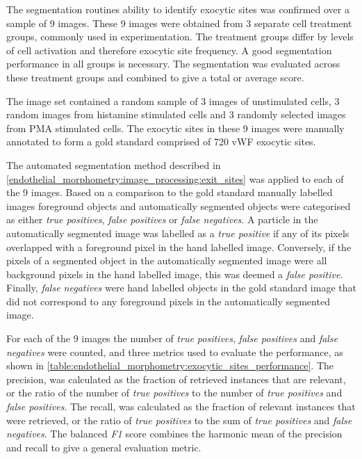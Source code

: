 The segmentation routines ability to identify exocytic sites was confirmed over a sample of 9 images. These 9 images were obtained from 3 separate cell treatment groups, commonly used in experimentation. The treatment groups differ by levels of cell activation and therefore exocytic site frequency. A good segmentation performance in all groups is necessary. The segmentation was evaluated across these treatment groups and combined to give a total or average score.

The image set contained a random sample of 3 images of unstimulated cells, 3 random images from histamine stimulated cells and 3 randomly selected images from PMA stimulated cells. The exocytic sites in these 9 images were manually annotated to form a gold standard comprised of 720 vWF exocytic sites.

The automated segmentation method described in \autoref{endothelial_morphometry:image_processing:exit_sites} was applied to each of the 9 images. Based on a comparison to the gold standard manually labelled images foreground objects and automatically segmented objects were categorised as either \emph{true positives}, \emph{false positives} or \emph{false negatives}. A particle in the automatically segmented image was labelled as a \emph{true positive} if any of its pixels overlapped with a foreground pixel in the hand labelled image. Conversely, if the pixels of a segmented object in the automatically segmented image were all background pixels in the hand labelled image, this was deemed a \emph{false positive}. Finally, \emph{false negatives} were hand labelled objects in the gold standard image that did not correspond to any foreground pixels in the automatically segmented image.

For each of the 9 images the number of \emph{true positives}, \emph{false positives} and \emph{false negatives} were counted, and three metrics used to evaluate the performance, as shown in \autoref{table:endothelial_morphometry:exocytic_sites_performance}. The precision, was calculated as the fraction of retrieved instances that are relevant, or the ratio of the number of \emph{true positives} to the number of \emph{true positives} and \emph{false positives}. The recall, was calculated as the fraction of relevant instances that were retrieved, or the ratio of \emph{true positives} to the sum of \emph{true positives} and \emph{false negatives}. The balanced \emph{F1} score combines the harmonic mean of the precision and recall to give a general evaluation metric.

